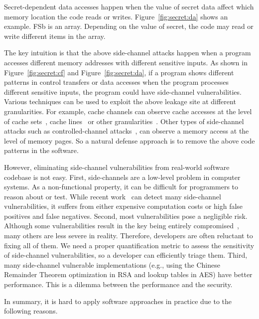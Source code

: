 Secret-dependent data accesses happen when the value of secret data affect which memory location the code reads or writes. Figure~\ref{fig:secret:da} shows an example. \textsf{FSb} is an array. Depending on the value of \textsf{secret}, the code may read or write different items in the array.

The key intuition is that the above side-channel attacks happen when a program accesses different memory addresses with different sensitive inputs. As shown in Figure~\ref{fig:secret:cf} and Figure~\ref{fig:secret:da}, if a program shows different patterns in control transfers or data accesses when the program processes different sensitive inputs, the program could have side-channel vulnerabilities. Various techniques can be used to exploit the above leakage site at different granularities. For example, cache channels can observe cache accesses at the level of cache sets~\cite{liu2015last}, cache lines~\cite{184415} or other granularities~\cite{yarom2017cachebleed}. Other types of side-channel attacks such as controlled-channel attacks~\cite{7163052}, can observe a memory access at the level of memory pages. So a natural defense approach is to remove the above code patterns in the software.


However, eliminating side-channel vulnerabilities from real-world software codebase is not easy. First, side-channels are a low-level problem in computer systems. As a non-functional property, it can be difficult for programmers to reason about or test.  While recent work~\cite{203878,217537,Wichelmann:2018:MFF:3274694.3274741,Brotzman19Casym,236338,182946} can detect many side-channel vulnerabilities, it suffers from either expensive computation costs or high false positives and false negatives.  Second, most vulnerabilities pose a negligible risk. Although some vulnerabilities result in the key being entirely compromised~\cite{184415, aumuller2002fault}, many others are less severe in reality. Therefore, developers are often reluctant to fixing all of them. We need a proper quantification metric to assess the sensitivity of side-channel vulnerabilities, so a developer can efficiently triage them.  Third, many side-channel vulnerable implementations (e.g., using the Chinese Remainder Theorem optimization in RSA and lookup tables in AES) have better performance. This is a dilemma between the performance and the security.


In summary, it is hard to apply software approaches in practice due to the following reasons.

